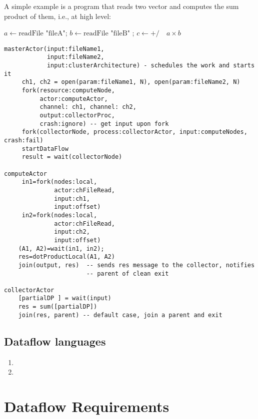 \documentclass[11pt,a4paper]{article}
\begin{document}
\begin{Example}

  A simple example is a program that reads two vector and computes the
  sum product of them, i.e., at high level:
\begin{algorithmic}
  \State $a\gets \textrm{readFile "fileA"}$;  $b\gets \textrm{readFile "fileB"}$ ; $c\gets  \textrm{+/} \quad a\times b$
\end{algorithmic}  


\begin{lstlisting}
masterActor(input:fileName1, 
            input:fileName2, 
            input:clusterArchitecture) - schedules the work and starts it
     ch1, ch2 = open(param:fileName1, N), open(param:fileName2, N)
     fork(resource:computeNode, 
          actor:computeActor, 
          channel: ch1, channel: ch2,
          output:collectorProc,
          crash:ignore) -- get input upon fork
     fork(collectorNode, process:collectorActor, input:computeNodes, crash:fail)
     startDataFlow
     result = wait(collectorNode)

computeActor
     in1=fork(nodes:local, 
              actor:chFileRead, 
              input:ch1,
              input:offset)
     in2=fork(nodes:local, 
              actor:chFileRead, 
              input:ch2,
              input:offset)
    (A1, A2)=wait(in1, in2);
    res=dotProductLocal(A1, A2)
    join(output, res)  -- sends res message to the collector, notifies
                       -- parent of clean exit

collectorActor
    [partialDP ] = wait(input)
    res = sum([partialDP])
    join(res, parent) -- default case, join a parent and exit

\end{lstlisting}


\end{Example}


\subsection{Dataflow languages}


\begin{enumerate}
  \item


\item 
\end{enumerate}


\section{Dataflow Requirements}
\label{sec:dataflow-requirements}
\end{document}
